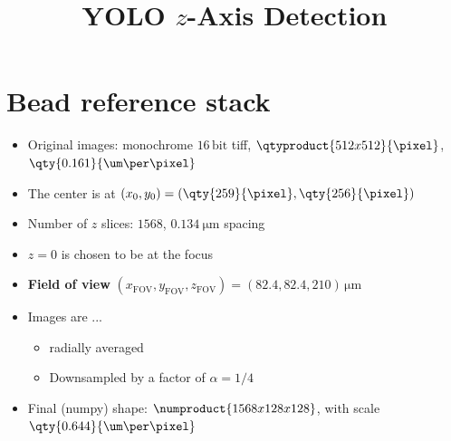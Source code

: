\documentclass[
  headings=standardclasses,
  a4paper,
  parskip=half,  %
  cleardoublepage=plain,  %
  DIV=18,
  fontsize=10pt
  ]{scrartcl}
\title{YOLO $z$-Axis Detection\vspace{-1em}}
\author{}
\date{}
\begin{document}
    \maketitle
    \section*{Bead reference stack}

    \begin{itemize}
        \item Original images: monochrome $16 \,\text{bit}$ tiff, $\qtyproduct{512x512}{\pixel}$, $\qty{0.161}{\um\per\pixel}$
        \item The center is at $(x_0,y_0)=(\qty{259}{\pixel},\qty{256}{\pixel})$
        \item Number of $z$ slices: $1568$, $\qty{0.134}{\um}$ spacing
        \item $z=0$ is chosen to be at the focus
        \item[$\rightarrow$] \textbf{Field of view} $(x_{\text{FOV}},y_{\text{FOV}},z_{\text{FOV}})=(82.4,82.4,210)\,\unit{\um}$
        \item Images are ...
        \begin{itemize}
            \item radially averaged
            \item Downsampled by a factor of $\alpha=1/4$
        \end{itemize} 
        \item[$\rightarrow$]  Final (numpy) shape: $\numproduct{1568x128x128}$, with scale $\qty{0.644}{\um\per\pixel}$
    \end{itemize}
\end{document}
